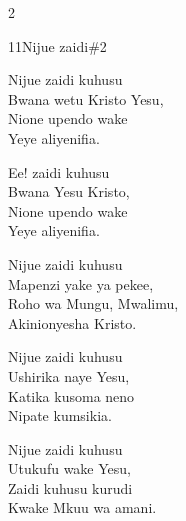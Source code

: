 \documentclass{article}
\begin{document}
\begin{multicols}{2}
\begin{hymn}{11}{Nijue zaidi}{\#2}
\begin{stanza}
Nijue zaidi kuhusu\\
Bwana wetu Kristo Yesu,\\
Nione upendo wake\\
Yeye aliyenifia.
\end{stanza}
\begin{chorus}
Ee! zaidi kuhusu\\
Bwana Yesu Kristo,\\
Nione upendo wake\\
Yeye aliyenifia.
\end{chorus}
\begin{stanza}
Nijue zaidi kuhusu\\
Mapenzi yake ya pekee,\\
Roho wa Mungu, Mwalimu,\\
Akinionyesha Kristo.
\end{stanza}
\begin{stanza}
Nijue zaidi kuhusu\\
Ushirika naye Yesu,\\
Katika kusoma neno\\
Nipate kumsikia.
\end{stanza}
\begin{stanza}
Nijue zaidi kuhusu\\
Utukufu wake Yesu,\\
Zaidi kuhusu kurudi\\
Kwake Mkuu wa amani.
\end{stanza}
\end{hymn}


\end{multicols}
\end{document}
